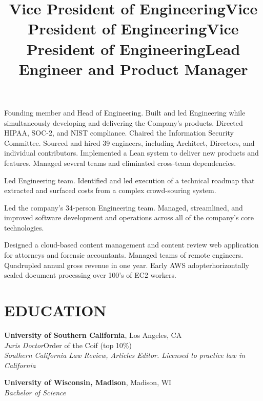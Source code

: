 \documentclass[margin]{res}
\begin{document}
\begin{resume}
\title{\textbf{Vice President of Engineering}}
\begin{position}
\hspace*{.5cm}Founding member and Head of Engineering. Built and led Engineering while simultaneously developing and delivering the Company's products. Directed HIPAA, SOC-2, and NIST compliance. Chaired the Information Security Committee. Sourced and hired 39 engineers, including Architect, Directors, and individual contributors. Implemented a Lean system to deliver new products and features. Managed several teams and eliminated cross-team dependencies.
\end{position}

\title{\textbf{Vice President of Engineering}}
\begin{position}
\hspace*{.5cm}Led Engineering team. Identified and led execution of a technical roadmap that extracted and surfaced costs from a complex crowd-souring system.
\end{position}

\title{\textbf{Vice President of Engineering}}
\begin{position}
\hspace*{.5cm}Led the company's 34-person Engineering team. Managed, streamlined, and improved software development and operations across all of the company's core technologies.
\end{position}

\title{\textbf{Lead Engineer and Product Manager}}
\begin{position}
\hspace*{.5cm}Designed a cloud-based content management and content review web application for attorneys and forensic accountants.  Managed teams of remote engineers. Quadrupled annual gross revenue in one year. Early AWS adopter\textemdash horizontally scaled document processing over 100's of EC2 workers.
\end{position}


\section{EDUCATION}

\textbf{University of Southern California}, Los Angeles, CA\\
{\sl Juris Doctor}\hfill Order of the Coif
(top 10\%)
\\
{\sl Southern California Law Review, Articles Editor. Licensed to practice law in California}

\textbf{University of Wisconsin, Madison}, Madison, WI\\
{\sl Bachelor of Science}

\end{resume}
\end{document}
